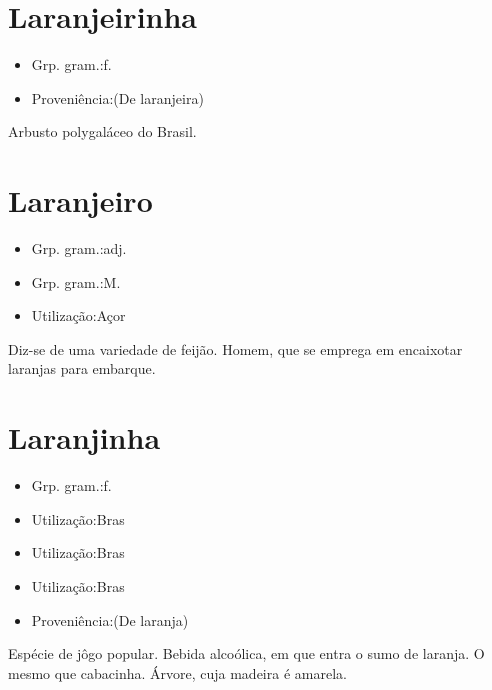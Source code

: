 \section{Laranjeirinha}
\begin{itemize}
\item {Grp. gram.:f.}
\end{itemize}
\begin{itemize}
\item {Proveniência:(De \textunderscore laranjeira\textunderscore )}
\end{itemize}
Arbusto polygaláceo do Brasil.
\section{Laranjeiro}
\begin{itemize}
\item {Grp. gram.:adj.}
\end{itemize}
\begin{itemize}
\item {Grp. gram.:M.}
\end{itemize}
\begin{itemize}
\item {Utilização:Açor}
\end{itemize}
Diz-se de uma variedade de feijão.
Homem, que se emprega em encaixotar laranjas para embarque.
\section{Laranjinha}
\begin{itemize}
\item {Grp. gram.:f.}
\end{itemize}
\begin{itemize}
\item {Utilização:Bras}
\end{itemize}
\begin{itemize}
\item {Utilização:Bras}
\end{itemize}
\begin{itemize}
\item {Utilização:Bras}
\end{itemize}
\begin{itemize}
\item {Proveniência:(De \textunderscore laranja\textunderscore )}
\end{itemize}
Espécie de jôgo popular.
Bebida alcoólica, em que entra o sumo de laranja.
O mesmo que \textunderscore cabacinha\textunderscore .
Árvore, cuja madeira é amarela.
